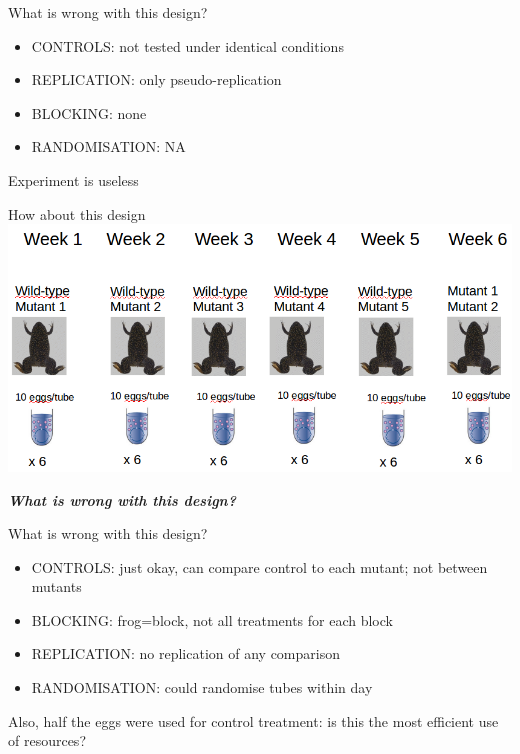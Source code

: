 \documentclass[10pt]{beamer}
\begin{document}
\begin{frame}{What is wrong with this design?}
 \begin{alertblock}{}
 \begin{itemize}
  \item CONTROLS: not tested under identical conditions
  \item REPLICATION: only pseudo-replication
  \item BLOCKING: none
  \item RANDOMISATION: NA
 \end{itemize}
 \end{alertblock}
 
 \pause
 
 Experiment is useless

\end{frame}
\begin{frame}{How about this design}
 \includegraphics[width=\textwidth]{Figures/expdes3}
 \pause
 
 \emph{\textbf{What is wrong with this design?}}
\end{frame}


\begin{frame}{What is wrong with this design?}
 \begin{alertblock}{}
 \begin{itemize}
  \item CONTROLS: just okay, can compare control to each mutant; not between mutants
  \item BLOCKING: frog=block, not all treatments for each block
  \item REPLICATION: no replication of any comparison
  \item RANDOMISATION: could randomise tubes within day
 \end{itemize}
 Also, half the eggs were used for control treatment: is this the most efficient use of resources?
 \end{alertblock}
 
\end{frame}
\end{document}
